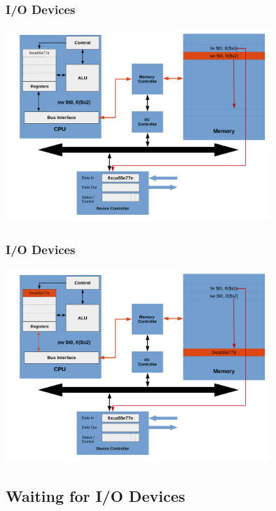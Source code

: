 \documentclass{beamer}
\begin{document}
\begin{frame}%
\frametitle{I/O Devices}

\vspace*{-0.2cm}
\begin{center}
\hspace*{-1cm}\includegraphics[width=10cm]{io_device5.pdf}
\end{center}

\end{frame}

\begin{frame}%
\frametitle{I/O Devices}

\vspace*{-0.2cm}
\begin{center}
\hspace*{-1cm}\includegraphics[width=10cm]{io_device6.pdf}
\end{center}

\end{frame}

\subsection{Waiting for I/O Devices}
\end{document}
